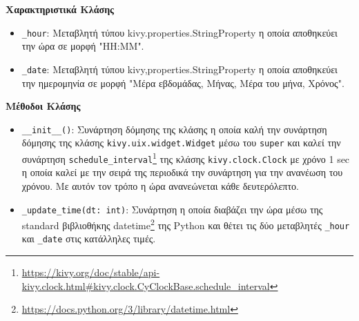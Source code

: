 \noindent\textbf{Χαρακτηριστικά Κλάσης}
\begin{itemize}
	\item \texttt{\_hour}: Μεταβλητή τύπου kivy.properties.StringProperty η οποία αποθηκεύει την ώρα σε μορφή "HH:MM".
	\item \texttt{\_date}: Μεταβλητή τύπου kivy,properties.StringProperty η οποία αποθηκεύει την ημερομηνία σε μορφή "Μέρα εβδομάδας, Μήνας, Μέρα του μήνα, Χρόνος".
\end{itemize}
\newpage
\noindent\textbf{Μέθοδοι Κλάσης}
\begin{itemize}
	\item \texttt{\_\_init\_\_()}: Συνάρτηση δόμησης της κλάσης η οποία καλή την συνάρτηση δόμησης της κλάσης \texttt{kivy.uix.widget.Widget} μέσω του \texttt{super} και καλεί την συνάρτηση \texttt{schedule\_interval}\footnote{\href{https://kivy.org/doc/stable/api-kivy.clock.html\#kivy.clock.CyClockBase.schedule\_interval}{https://kivy.org/doc/stable/api-kivy.clock.html\#kivy.clock.CyClockBase.schedule\_interval}} της κλάσης \texttt{kivy.clock.Clock} με χρόνο 1 sec η οποία καλεί με την σειρά της περιοδικά την συνάρτηση για την ανανέωση του χρόνου. Με αυτόν τον τρόπο η ώρα ανανεώνεται κάθε δευτερόλεπτο.
	\item \texttt{\_update\_time(dt: int)}: Συνάρτηση η οποία διαβάζει την ώρα μέσω της standard βιβλιοθήκης datetime\footnote{\href{https://docs.python.org/3/library/datetime.html}{https://docs.python.org/3/library/datetime.html}} της Python και θέτει τις δύο μεταβλητές \texttt{\_hour} και \texttt{\_date} στις κατάλληλες τιμές.
\end{itemize}

\newpage
